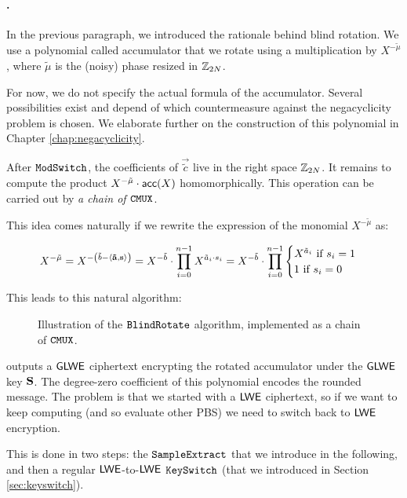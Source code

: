 \paragraph{\BlindRotate.}

In the previous paragraph, we introduced the rationale behind blind rotation. We use a polynomial called accumulator that we rotate using a multiplication by $X^{-\tilde \mu}$, where $\tilde \mu$ is the (noisy) phase resized in $\mathbb{Z}_{2N}$.

For now, we do not specify the actual formula of the accumulator. Several possibilities exist and depend of which countermeasure against the negacyclicity problem is chosen. We elaborate further on the construction of this polynomial in Chapter \ref{chap:negacyclicity}.


After $\texttt{ModSwitch}$, the coefficients of $\vec{\tilde{c}}$ live in the right space $\mathbb{Z}_{2N}$. It remains to compute the product $X^{-\tilde \mu} \cdot \textsf{acc}(X)$ homomorphically. This operation can be carried out by \textit{a chain of $\texttt{CMUX}$}.


This idea comes naturally if we rewrite the expression of the monomial $X^{-\tilde \mu}$ as:

\[
	X^{-\tilde \mu} = X^{- \left ( \tilde b - \left \langle \mathbf{\tilde a}, \mathbf s \right \rangle \right ) } =  X^{-\tilde b} \cdot \prod_{i=0}^{n-1} X^{\tilde a_i \cdot s_i} = X^{-\tilde b} \cdot \prod_{i=0}^{n-1} \begin{cases}
		X^{\tilde a_i} \text{ if } s_i = 1\\
		1 \text{ if } s_i = 0
	\end{cases}
\]


This leads to this natural algorithm:




\begin{figure}
	\centering
	\blindRotatePicture
	\caption{Illustration of the $\texttt{BlindRotate}$ algorithm, implemented as a chain of $\texttt{CMUX}$.}
	\label{fig:cmux_chain}
\end{figure}


\BlindRotate outputs a $\textsf{GLWE}$ ciphertext encrypting the rotated accumulator under the $\textsf{GLWE}$ key $\mathbf S$. The degree-zero coefficient of this polynomial encodes the rounded message. The problem is that we started with a $\textsf{LWE}$ ciphertext, so if we want to keep computing (and so evaluate other PBS) we need to switch back to $\textsf{LWE}$ encryption.


This is done in two steps: the $\texttt{SampleExtract}$ that we introduce in the following, and then a regular $\textsf{LWE}$-to-$\textsf{LWE}$ $\texttt{KeySwitch}$ (that we introduced in Section \ref{sec:keyswitch}).


